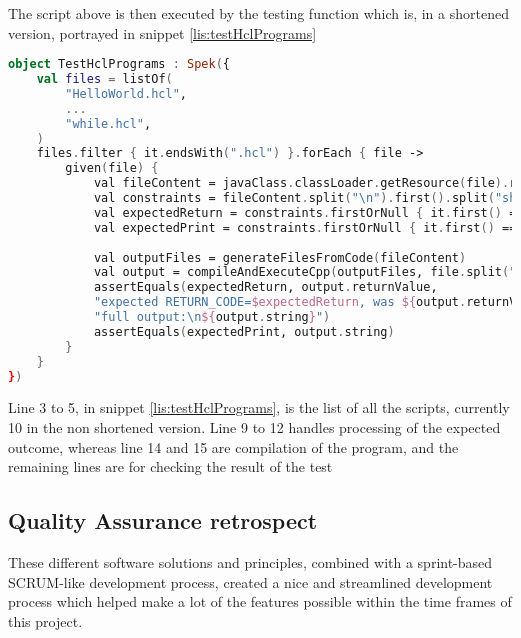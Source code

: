 The script above is then executed by the testing function which is, in a shortened version, portrayed in snippet \ref{lis:testHclPrograms}
\begin{lstlisting}[language=Kotlin,label={lis:testHclPrograms},caption={Shortened version of the test for system tests}]
object TestHclPrograms : Spek({
	val files = listOf(
		"HelloWorld.hcl",
		...
		"while.hcl",
	)
	files.filter { it.endsWith(".hcl") }.forEach { file ->
		given(file) {
			val fileContent = javaClass.classLoader.getResource(file).readText()
			val constraints = fileContent.split("\n").first().split("should 		").drop(1).map { it.split(" ") }
			val expectedReturn = constraints.firstOrNull { it.first() == "return" }?.get(1)?.toInt() ?: 0
			val expectedPrint = constraints.firstOrNull { it.first() == "print" }?.drop(1)?.joinToString(" ") ?: " "
			
			val outputFiles = generateFilesFromCode(fileContent)
			val output = compileAndExecuteCpp(outputFiles, file.split(".").first(), keepFiles)!!
			assertEquals(expectedReturn, output.returnValue,
			"expected RETURN_CODE=$expectedReturn, was ${output.returnValue}\n" +
			"full output:\n${output.string}")
			assertEquals(expectedPrint, output.string)	
		}
	}
})
\end{lstlisting}

Line 3 to 5, in snippet \ref{lis:testHclPrograms}, is the list of all the scripts, currently 10 in the non shortened version. 
Line 9 to 12 handles processing of the expected outcome, whereas line 14 and 15 are compilation of the program, and the remaining lines are for checking the result of the test

\subsection{Quality Assurance retrospect}

These different software solutions and principles, combined with a sprint-based SCRUM-like development process, created a nice and streamlined development process which helped make a lot of the features possible within the time frames of this project.